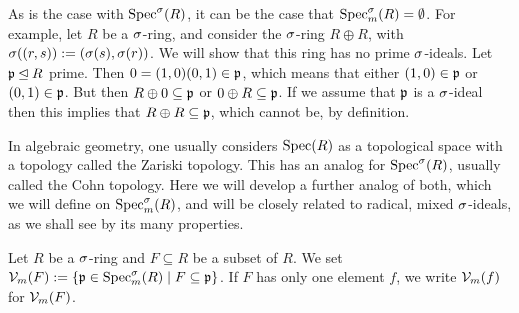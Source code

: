 \begin{rem}
As is the case with $\operatorname{Spec}^\sigma(R)$, it can be the case that $\operatorname{Spec}^\sigma_m(R)= \emptyset$. For example, let $R$ be a $\sigma$-ring, and consider the $\sigma$-ring $R \oplus R$, with $\sigma( (r,s)):= (\sigma(s),\sigma(r))$. 
We will show that this ring has no prime $\sigma$-ideals. Let $\mathfrak{p} \unlhd R$ prime. Then $0 = (1,0)(0,1) \in \mathfrak{p}$, which means that either $(1,0) \in \mathfrak{p}$ or $(0,1) \in \mathfrak{p}$. But then $R \oplus 0 \subseteq \mathfrak{p}$ or $0 \oplus R \subseteq \mathfrak{p}$. If we assume that $\mathfrak{p}$ is a $\sigma$-ideal then
 this implies that $R \oplus R \subseteq \mathfrak{p}$, which cannot be, by definition.
\end{rem}

In algebraic geometry, one usually considers $\operatorname{Spec}(R)$ as a topological space with a topology called the Zariski topology. This has an analog for $\operatorname{Spec}^\sigma(R)$, usually called the Cohn topology. Here we will develop a further analog of both,
 which we will define on $\operatorname{Spec}^\sigma_m(R)$, and will be closely related to radical, mixed $\sigma$-ideals, as we shall see by its many properties.

\begin{defn}
Let $R$ be a $\sigma$-ring and $F \subseteq R$ be a subset of $R$. We set $\mathcal{V}_m (F):= \{ \mathfrak{p} \in \operatorname{Spec}^\sigma_m(R) \mid F \subseteq \mathfrak{p} \}$. 
If $F$ has only one element $f$, we write $\mathcal{V}_m(f)$ for $\mathcal{V}_m(F)$. 
\end{defn}

